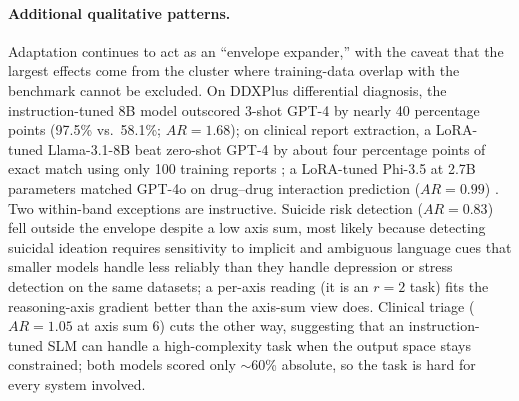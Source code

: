 \documentclass[11pt]{article}
\begin{document}
\paragraph{Additional qualitative patterns.}
Adaptation continues to act as an ``envelope expander,'' with the caveat that the largest effects come from the cluster where training-data overlap with the benchmark cannot be excluded. On DDXPlus differential diagnosis, the instruction-tuned 8B model outscored 3-shot GPT-4 by nearly 40 percentage points (97.5\% vs.\ 58.1\%; $AR = 1.68$); on clinical report extraction, a LoRA-tuned Llama-3.1-8B beat zero-shot GPT-4 by about four percentage points of exact match using only 100 training reports \cite{Liu2025ClinIE}; a LoRA-tuned Phi-3.5 at 2.7B parameters matched GPT-4o on drug--drug interaction prediction ($AR = 0.99$) \cite{DeVito2025}. Two within-band exceptions are instructive. Suicide risk detection ($AR = 0.83$) fell outside the envelope despite a low axis sum, most likely because detecting suicidal ideation requires sensitivity to implicit and ambiguous language cues that smaller models handle less reliably than they handle depression or stress detection on the same datasets; a per-axis reading (it is an $r=2$ task) fits the reasoning-axis gradient better than the axis-sum view does. Clinical triage ($AR = 1.05$ at axis sum 6) cuts the other way, suggesting that an instruction-tuned SLM can handle a high-complexity task when the output space stays constrained; both models scored only $\sim$60\% absolute, so the task is hard for every system involved.
\end{document}
